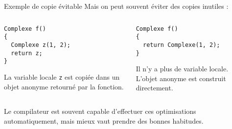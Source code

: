 \documentclass[c]{beamer}
\begin{document}

\begin{frame}[fragile]{Exemple de copie évitable}
Mais on peut souvent éviter des copies inutiles :

\begin{columns}
\begin{column}{0.5\columnwidth}
\begin{verbatim}
Complexe f()
{
  Complexe z(1, 2);
  return z;
}
\end{verbatim}

\begin{cbox}[][lwuc][\centering\footnotesize]
La variable locale \texttt{z} est copiée dans un objet anonyme retourné par la
fonction.
\end{cbox}

\pause
\end{column}
\begin{column}{0.5\columnwidth}
\begin{verbatim}
Complexe f()
{
  return Complexe(1, 2);
}
\end{verbatim}

\vspace{0.7em}

\begin{cbox}[][lwuc][\centering\footnotesize]
Il n'y a plus de variable locale. L'objet anonyme est construit directement.
\end{cbox}
\end{column}
\end{columns}

\vspace{1.5em}
\pause
{\small Le compilateur est souvent capable d'effectuer ces optimisations automatiquement, mais mieux vaut prendre des bonnes habitudes.}

\end{frame}
\end{document}
